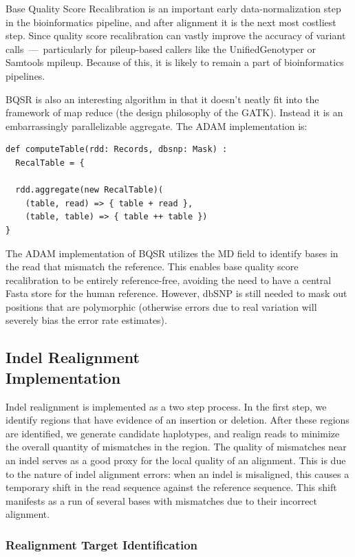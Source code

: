 \documentclass[10pt,twocolumn]{article}
\theoremstyle{plain}
\begin{document}
Base Quality Score Recalibration is an important early data-normalization step in the bioinformatics pipeline, and after alignment
it is the next most costliest step. Since quality score recalibration can vastly improve the accuracy of variant calls~---~particularly for
pileup-based callers like the UnifiedGenotyper or Samtools mpileup. Because of this, it is likely to remain a part of bioinformatics pipelines.

BQSR is also an interesting algorithm in that it doesn't neatly fit into the framework of map reduce (the design philosophy of the GATK).
Instead it is an embarrassingly parallelizable aggregate. The ADAM implementation is:

\begin{lstlisting}
def computeTable(rdd: Records, dbsnp: Mask) :
  RecalTable = {
  
  rdd.aggregate(new RecalTable)(
    (table, read) => { table + read },
    (table, table) => { table ++ table })
}
\end{lstlisting}

The ADAM implementation of BQSR utilizes the MD field to identify bases in the read that mismatch the reference. This enables
base quality score recalibration to be entirely reference-free, avoiding the need to have a central Fasta store for the human
reference. However, dbSNP is still needed to mask out positions that are polymorphic (otherwise errors due to real variation will
severely bias the error rate estimates).

\subsection{Indel Realignment\\Implementation}
\label{sec:indel-realignment-implementation}

Indel realignment is implemented as a two step process. In the first step, we identify regions that have evidence of an insertion or
deletion. After these regions are identified, we generate candidate haplotypes, and realign reads to minimize the overall quantity
of mismatches in the region. The quality of mismatches near an indel serves as a good proxy for the local quality of an alignment.
This is due to the nature of indel alignment errors: when an indel is misaligned, this causes a temporary shift in the read sequence
against the reference sequence. This shift manifests as a run of several bases with mismatches due to their incorrect alignment.

\subsubsection{Realignment Target Identification}
\label{sec:realignment-target-identification}
\end{document}
